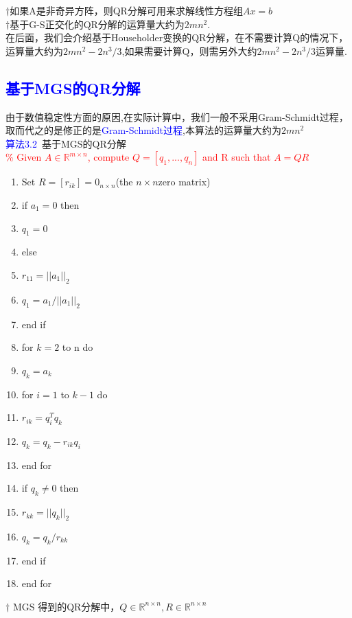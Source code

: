 \documentclass[12pt,a4paper]{article}
\begin{document}
$\dagger$如果A是非奇异方阵，则QR分解可用来求解线性方程组$Ax=b$\\

$\dagger$基于G-S正交化的QR分解的运算量大约为$2mn^{2}$.\\

在后面，我们会介绍基于Householder变换的QR分解，在不需要计算Q的情况下，运算量大约为$2mn^{2}-2n^{3}/3$,如果需要计算Q，则需另外大约$2mn^{2}-2n^{3}/3$运算量.\\
\subsection{\textcolor{blue}{基于MGS的QR分解}}
由于数值稳定性方面的原因,在实际计算中，我们一般不采用Gram-Schmidt过程，取而代之的是修正的是\textcolor{blue}{Gram-Schmidt过程},本算法的运算量大约为$2mn^{2}$\\
\textcolor{blue}{算法3.2}~基于MGS的QR分解\\
\textcolor{red}{\% Given $A \in \mathbb{R}^{m\times n}$, compute $Q = [q_{1},...,q_{n}]$ and R such that $A = QR$}\\
\begin{enumerate}
\item Set $R=[r_{ik}]=0_{n\times n}$(the $n\times n$zero matrix)
\item if $a_{1}=0$ then 
\item \qquad $q_{1}=0$
\item else
\item \qquad $r_{11}=||a_{1}||_{2}$
\item \qquad $q_{1}=a_{1}/||a_{1}||_{2}$
\item end if
\item for $k=2$ to n do
\item \qquad $q_{k} = a_{k}$
\item \qquad for $i = 1$ to $k-1$ do
\item \qquad \qquad $r_{ik}=q_{i}^{T}q_{k}$
\item \qquad \qquad $q_{k}=q_{k}-r_{ik}q_{i}$
\item \qquad end for 
\item \qquad if $q_{k}\ne 0$ then
\item \qquad \qquad $r_{kk}=||q_{k}||_{2}$
\item \qquad \qquad $q_{k}=q_{k}/r_{kk}$
\item \qquad end if
\item end for  
\end{enumerate}
$\dagger$ MGS 得到的QR分解中，$Q\in\mathbb{R}^{n\times n},R\in\mathbb{R}^{n\times n}$
\end{document}
